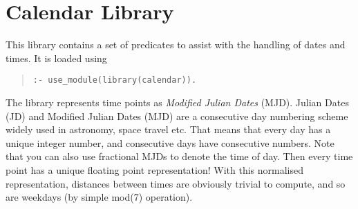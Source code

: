 %
% 
% 
% 
% 
%
%
%

\section{Calendar Library}
\label{chapcal}
This library contains a set of predicates to assist with the handling
of dates and times.  It is loaded using
\begin{quote}\begin{verbatim}
:- use_module(library(calendar)).
\end{verbatim}\end{quote}
The library represents time points as {\em Modified Julian Dates} (MJD).
Julian Dates (JD) and Modified Julian Dates (MJD) are a
consecutive day numbering scheme widely used in astronomy,
space travel etc.
That means that every day has a unique integer number, and consecutive
days have consecutive numbers.
Note that you can also use fractional MJDs to denote the time of day.
Then every time point has a unique floating point representation!
With this normalised representation, distances between times are
obviously trivial to compute, and so are weekdays (by simple mod(7)
operation).

